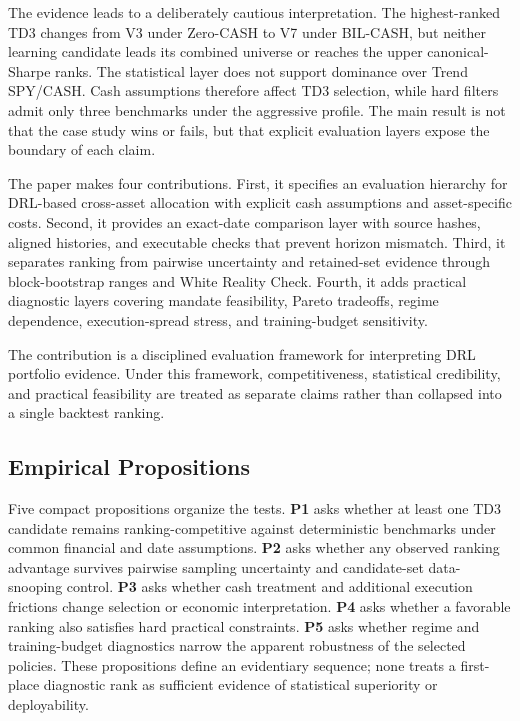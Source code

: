 \documentclass[11pt]{article}
\newcommand{\cashzero}{Zero-CASH}
\newcommand{\cashbil}{BIL-CASH}
\begin{document}
The evidence leads to a deliberately cautious interpretation. The highest-ranked TD3 changes from V3 under \cashzero{} to V7 under \cashbil{}, but neither learning candidate leads its combined universe or reaches the upper canonical-Sharpe ranks. The statistical layer does not support dominance over Trend SPY/CASH. Cash assumptions therefore affect TD3 selection, while hard filters admit only three benchmarks under the aggressive profile. The main result is not that the case study wins or fails, but that explicit evaluation layers expose the boundary of each claim.

The paper makes four contributions. First, it specifies an evaluation hierarchy for DRL-based cross-asset allocation with explicit cash assumptions and asset-specific costs. Second, it provides an exact-date comparison layer with source hashes, aligned histories, and executable checks that prevent horizon mismatch. Third, it separates ranking from pairwise uncertainty and retained-set evidence through block-bootstrap ranges and White Reality Check. Fourth, it adds practical diagnostic layers covering mandate feasibility, Pareto tradeoffs, regime dependence, execution-spread stress, and training-budget sensitivity.

The contribution is a disciplined evaluation framework for interpreting DRL portfolio evidence. Under this framework, competitiveness, statistical credibility, and practical feasibility are treated as separate claims rather than collapsed into a single backtest ranking.

\subsection{Empirical Propositions}

Five compact propositions organize the tests. \textbf{P1} asks whether at least one TD3 candidate remains ranking-competitive against deterministic benchmarks under common financial and date assumptions. \textbf{P2} asks whether any observed ranking advantage survives pairwise sampling uncertainty and candidate-set data-snooping control. \textbf{P3} asks whether cash treatment and additional execution frictions change selection or economic interpretation. \textbf{P4} asks whether a favorable ranking also satisfies hard practical constraints. \textbf{P5} asks whether regime and training-budget diagnostics narrow the apparent robustness of the selected policies. These propositions define an evidentiary sequence; none treats a first-place diagnostic rank as sufficient evidence of statistical superiority or deployability.
\end{document}
